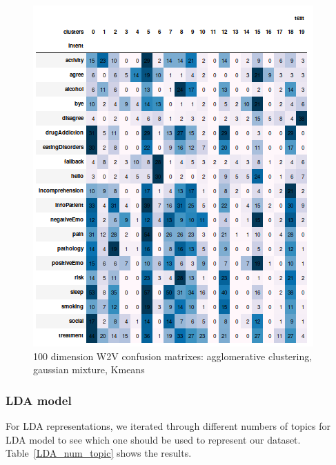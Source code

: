 \documentclass[11pt]{article}
\begin{document}
\begin{figure}[h]
	\includegraphics[scale=0.28]{w2v100_km.png}
	\caption{100 dimension W2V confusion matrixes: agglomerative clustering, gaussian mixture, Kmeans}
\label{w2v100_cm}
\end{figure}
\FloatBarrier


\subsubsection{LDA model}
\label{subsec:lda}

For LDA representations, we iterated through different numbers of
topics for LDA model to see which one should be used to represent our
dataset. Table~\ref{LDA_num_topic} shows the results. 
\end{document}
